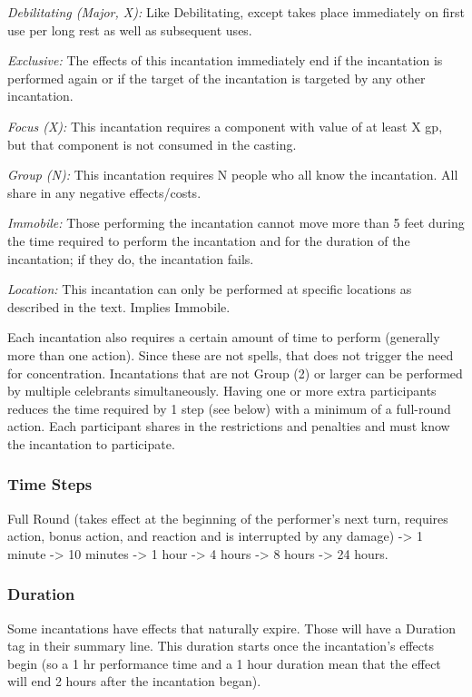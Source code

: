 \textit{Debilitating (Major, X):} Like Debilitating, except takes place immediately on first use per long rest as well as subsequent uses.

\textit{Exclusive:} The effects of this incantation immediately end if the incantation is performed again or if the target of the incantation is targeted by any other incantation.

\textit{Focus (X):} This incantation requires a component with value of at least X gp, but that component is not consumed in the casting.

\textit{Group (N):} This incantation requires N people who all know the incantation. All share in any negative effects/costs.

\textit{Immobile:} Those performing the incantation cannot move more than 5 feet during the time required to perform the incantation and for the duration of the incantation; if they do, the incantation fails.

\textit{Location:} This incantation can only be performed at specific locations as described in the text. Implies Immobile.

Each incantation also requires a certain amount of time to perform (generally more than one action). Since these are not spells, that does not trigger the need for concentration. Incantations that are not Group (2) or larger can be performed by multiple celebrants simultaneously. Having one or more extra participants reduces the time required by 1 step (see below) with a minimum of a full-round action. Each participant shares in the restrictions and penalties and must know the incantation to participate.

\subsubsection{Time Steps}
Full Round (takes effect at the beginning of the performer's next turn, requires action, bonus action, and reaction and is interrupted by any damage) -> 1 minute -> 10 minutes -> 1 hour -> 4 hours -> 8 hours -> 24 hours.

\subsubsection{Duration}
Some incantations have effects that naturally expire. Those will have a Duration tag in their summary line. This duration starts once the incantation's effects begin (so a 1 hr performance time and a 1 hour duration mean that the effect will end 2 hours after the incantation began).

